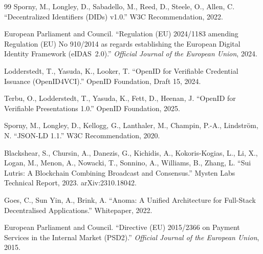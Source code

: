 \documentclass[11pt]{article}
\begin{document}
\begin{thebibliography}{99}
Sporny, M., Longley, D., Sabadello, M., Reed, D., Steele, O., Allen, C.
``Decentralized Identifiers (DIDs) v1.0.''
W3C Recommendation, 2022.

European Parliament and Council.
``Regulation (EU) 2024/1183 amending Regulation (EU) No 910/2014 as regards establishing the European Digital Identity Framework (eIDAS~2.0).''
\textit{Official Journal of the European Union}, 2024.

Lodderstedt, T., Yasuda, K., Looker, T.
``OpenID for Verifiable Credential Issuance (OpenID4VCI).''
OpenID Foundation, Draft 15, 2024.

Terbu, O., Lodderstedt, T., Yasuda, K., Fett, D., Heenan, J.
``OpenID for Verifiable Presentations 1.0.''
OpenID Foundation, 2025.

Sporny, M., Longley, D., Kellogg, G., Lanthaler, M., Champin, P.-A., Lindström, N.
``JSON-LD 1.1.''
W3C Recommendation, 2020.

Blackshear, S., Chursin, A., Danezis, G., Kichidis, A., Kokoris-Kogias, L., Li, X., Logan, M., Menon, A., Nowacki, T., Sonnino, A., Williams, B., Zhang, L.
``Sui Lutris: A Blockchain Combining Broadcast and Consensus.''
Mysten Labs Technical Report, 2023. arXiv:2310.18042.

Goes, C., Sun Yin, A., Brink, A.
``Anoma: A Unified Architecture for Full-Stack Decentralised Applications.''
Whitepaper, 2022.

European Parliament and Council.
``Directive (EU) 2015/2366 on Payment Services in the Internal Market (PSD2).''
\textit{Official Journal of the European Union}, 2015.

\end{thebibliography}
\end{document}
